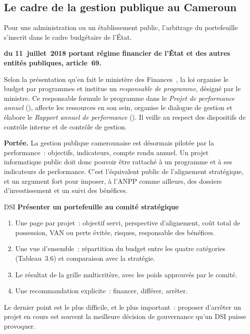 \subsection{Le cadre de la gestion publique au Cameroun}

Pour une administration ou un établissement public, l'arbitrage du
portefeuille s'inscrit dans le cadre budgétaire de l'État.

\begin{boxjuris}
\textbf{ du 11~juillet~2018 portant régime financier
de l'État et des autres entités publiques, article~69.}

\medskip
Selon la présentation qu'en fait le ministère des Finances~\cite{minfi2023regimefinancier},
la loi organise le budget par programmes et institue un
\emph{responsable de programme}, désigné par le ministre. Ce responsable
formule le programme dans le \emph{Projet de performance annuel}
(), affecte les ressources en son sein, organise le dialogue
de gestion et élabore le \emph{Rapport annuel de performance}
(). Il veille au respect des dispositifs de contrôle interne et
de contrôle de gestion.

\medskip
\textbf{Portée.} La gestion publique camerounaise est désormais pilotée
par la performance~: objectifs, indicateurs, compte rendu annuel. Un
projet informatique public doit donc pouvoir être rattaché à un programme
et à ses indicateurs de performance. C'est l'équivalent public de
l'alignement stratégique, et un argument fort pour imposer, à l'ANPP
comme ailleurs, des dossiers d'investissement et un suivi des bénéfices.
\end{boxjuris}

\begin{boxmetier}{DSI}
\textbf{Présenter un portefeuille au comité stratégique}
\begin{enumerate}
    \item Une page par projet~: objectif servi, perspective d'alignement,
          coût total de possession, VAN ou perte évitée, risques, responsable
          des bénéfices.
    \item Une vue d'ensemble~: répartition du budget entre les quatre
          catégories (Tableau~3.6) et comparaison avec la stratégie.
    \item Le résultat de la grille multicritère, avec les poids approuvés
          par le comité.
    \item Une recommandation explicite~: financer, différer, arrêter.
\end{enumerate}
Le dernier point est le plus difficile, et le plus important~: proposer
d'arrêter un projet en cours est souvent la meilleure décision de
gouvernance qu'un DSI puisse provoquer.
\end{boxmetier}

